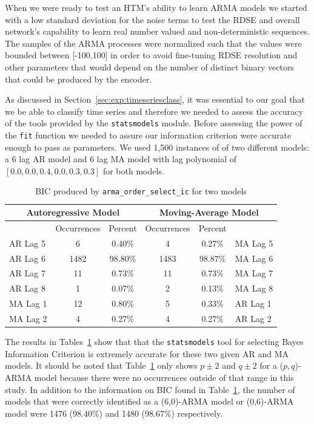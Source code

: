\documentclass[oneside,12pt,openany]{book}
\begin{document}
	When we were ready to test an HTM's ability to learn ARMA models we started with a low standard deviation for the noise terms to test the RDSE and overall network's capability to learn real number valued and non-deterministic sequences. The samples of the ARMA processes were normalized such that the values were bounded between [-100,100] in order to avoid fine-tuning RDSE resolution and other parameters that would depend on the number of distinct binary vectors that could be produced by the encoder.
	
	As discussed in Section~\ref{sec:exp:timeseriesclass}, it was essential to our goal that we be able to classify time series and therefore we needed to assess the accuracy of the tools provided by the \texttt{statsmodels} module. Before assessing the power of the \texttt{fit} function we needed to assure our information criterion were accurate enough to pass as parameters. We used 1,500 instances of of two different models: a 6 lag AR model and 6 lag MA model with lag polynomial of $[0.0,0.0,0.4,0.0,0.3,0.3]$ for both models.
	
	\begin{table}[!ht]
		\centering
		\begin{tabular}{|l|c|c|c|c|l|}
			\hline
			\multicolumn{3}{|c|}{Autoregressive Model} & \multicolumn{3}{c|}{Moving-Average Model} \\ \hline
			\cellcolor{black} & Occurrences & Percent & Occurrences & Percent & \cellcolor{black} \\ \hline
			AR Lag 5 & 6 & 0.40\% & 4 & 0.27\% & MA Lag 5 \\ \hline
			AR Lag 6 & 1482 & 98.80\% & 1483 & 98.87\% & MA Lag 6 \\ \hline
			AR Lag 7 & 11 & 0.73\% & 11 & 0.73\% & MA Lag 7 \\ \hline
			AR Lag 8 & 1 & 0.07\% & 2 & 0.13\% & MA Lag 8 \\ \hline
			MA Lag 1 & 12 & 0.80\% & 5 & 0.33\% & AR Lag 1 \\ \hline
			MA Lag 2 & 4 & 0.27\% & 4 & 0.27\% & AR Lag 2 \\ \hline
		\end{tabular}
		\caption{BIC produced by \texttt{arma\_order\_select\_ic} for two models}
		\label{tab:bic}
	\end{table}
	
	

	The results in Tables~\ref{tab:bic} show that that the \texttt{statsmodels} tool for selecting Bayes Information Criterion is extremely accurate for these two given AR and MA models. It should be noted that Table~\ref{tab:bic} only shows $p\pm2$ and $q\pm2$ for a ($p,q$)-ARMA model because there were no occurrences outside of that range in this study. In addition to the information on BIC found in Table~\ref{tab:bic}, the number of models that were correctly identified as a (6,0)-ARMA model or (0,6)-ARMA model were 1476 (98.40\%) and 1480 (98.67\%) respectively.  
	
\end{document}
